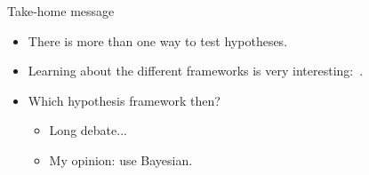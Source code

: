 \documentclass[aspectratio=169]{beamer}
\begin{document}
\begin{frame}{Take-home message}
  \begin{itemize}
  \item There is more than one way to test hypotheses.
  \item Learning about the different frameworks is very
    interesting:~\cite{christensen2005testing,berger2003could}.
  \item Which hypothesis framework then?
    \begin{itemize}
    \item Long debate...
    \item My opinion: use Bayesian.
    \end{itemize}
  \end{itemize}
\end{frame}
\end{document}
